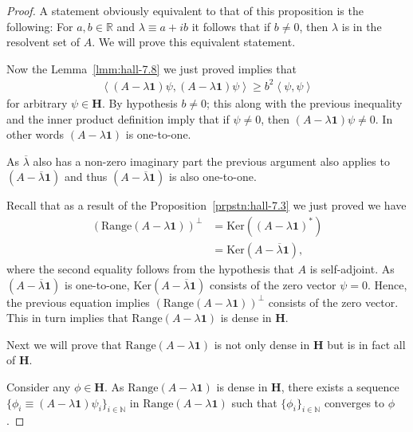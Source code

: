 \begin{proof}
    \leanok
A statement obviously equivalent to that of this proposition is the following: For $a,b \in \mathbb{R}$ and $\lambda \equiv a + ib$ it follows that if $b \neq 0$, then $\lambda$ is in the resolvent set of $A$. We will prove this equivalent statement.

Now the Lemma~\ref{lmm:hall-7.8} we just proved implies that
\begin{align}
    \left< (A - \lambda \mathbf{1}) \psi, (A - \lambda \mathbf{1}) \psi \right> \ge b^2 \left< \psi, \psi \right>
\end{align}
for arbitrary $\psi \in \mathbf{H}$. By hypothesis $b \neq 0$; this along with the previous inequality and the inner product definition imply that if $\psi \neq 0$, then $(A - \lambda \mathbf{1}) \psi \ne 0$. In other words $(A - \lambda \mathbf{1})$ is one-to-one.

As $\overline{\lambda}$ also has a non-zero imaginary part the previous argument also applies to $(A - \overline{\lambda} \mathbf{1})$ and thus $(A - \overline{\lambda} \mathbf{1})$ is also one-to-one.

Recall that as a result of the Proposition~\ref{prpstn:hall-7.3} we just proved we have
\begin{align}
    \left( \text{Range}(A - \lambda \mathbf{1}) \right)^\perp &= \text{Ker}((A - \lambda \mathbf{1})^*) \\
    \                                                         &= \text{Ker}(A - \overline{\lambda} \mathbf{1}),
\end{align}
where the second equality follows from the hypothesis that $A$ is self-adjoint. As $(A - \overline{\lambda} \mathbf{1})$ is one-to-one, $\text{Ker}(A - \overline{\lambda} \mathbf{1})$ consists of the zero vector $\psi = 0$. Hence, the previous equation implies $\left( \text{Range}(A - \lambda \mathbf{1}) \right)^\perp$ consists of the zero vector. This in turn implies that $\text{Range}(A - \lambda \mathbf{1})$ is dense in $\mathbf{H}$.

Next we will prove that $\text{Range}(A - \lambda \mathbf{1})$ is not only dense in $\mathbf{H}$ but is in fact all of $\mathbf{H}$.

Consider any $\phi \in \mathbf{H}$. As $\text{Range}(A - \lambda \mathbf{1})$ is dense in $\mathbf{H}$, there exists a sequence $\{ \phi_i \equiv (A - \lambda \mathbf{1}) \psi_i \}_{i \in \mathbb{N}}$ in $\text{Range}(A - \lambda \mathbf{1})$ such that $\{ \phi_i \}_{i \in \mathbb{N}}$ converges to $\phi$.


\end{proof}
